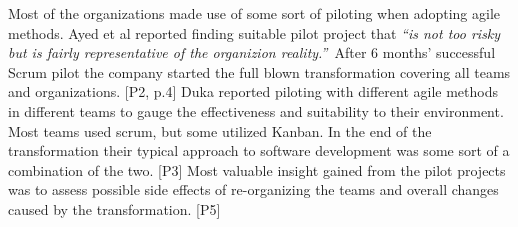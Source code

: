 Most of the organizations made use of some sort of piloting when
adopting agile methods. Ayed et al reported finding suitable pilot
project that \textit{``is not too risky but is fairly representative
of the organizion reality.''} After 6 months' successful Scrum pilot
the company started the full blown transformation covering all teams
and organizations. [P2, p.4] Duka reported piloting with different agile
methods in different teams to gauge the effectiveness and suitability
to their environment. Most teams used scrum, but some utilized Kanban.
In the end of the transformation their typical approach to software
development was some sort of a combination of the two. [P3] Most
valuable insight gained from the pilot projects was to assess possible
side effects of re-organizing the teams and overall changes caused by
the transformation. [P5]
